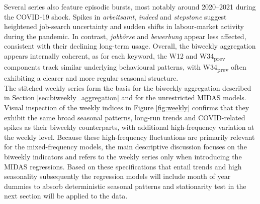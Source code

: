\documentclass[12pt,a4paper]{article}
\begin{document}
Several series also feature episodic bursts, most notably around 2020--2021 during the COVID-19 shock. Spikes in \textit{arbeitsamt}, \textit{indeed} and \textit{stepstone} suggest heightened job-search uncertainty and sudden shifts in labour-market activity during the pandemic. In contrast, \textit{jobbörse} and \textit{bewerbung} appear less affected, consistent with their declining long-term usage.
Overall, the biweekly aggregation appears internally coherent, as for each keyword, the W12 and W34\textsubscript{prev} components track similar underlying behavioural patterns, with W34\textsubscript{prev} often exhibiting a clearer and more regular seasonal structure. \\
The stitched weekly series form the basis for the biweekly aggregation described in Section \ref{sec:biweekly_aggregation} and for the unrestricted MIDAS models. Visual inspection of the weekly indices in Figure \ref{fig:weekly} confirms that they exhibit the same broad seasonal patterns, long-run trends and COVID-related spikes as their biweekly counterparts, with additional high-frequency variation at the weekly level. Because these high-frequency fluctuations are primarily relevant for the mixed-frequency models, the main descriptive discussion focuses on the biweekly indicators and refers to the weekly series only when introducing the MIDAS regressions.
Based on these specifications that entail trends and high seasonality subsequently the regression models will include month of year dummies to absorb deterministic seasonal patterns and stationarity test in the next section will be applied to the data.
\end{document}
